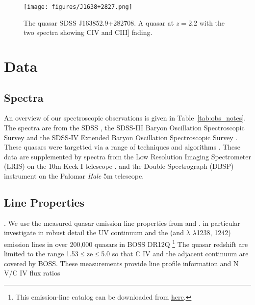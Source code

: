 \documentclass[a4paper,fleqn,usenatbib]{mnras}
\begin{document}
\begin{figure}
  \centering
  \texttt{[image: figures/J1638+2827.png]}
  \vspace{-12pt}
  \caption[]{The quasar SDSS J163852.9+282708. 
A quasar at $z = 2.2$ with the two spectra showing CIV and CIII] fading.}
  \label{fig:disk_suppression}
\end{figure}
\fi



\section{Data}
\subsection{Spectra}
An overview of our spectroscopic observations is given in Table~\ref{tab:obs_notes}. 
The spectra are from the SDSS \citep{Stoughton2002, DR7, Schneider2010},  
the SDSS-III Baryon Oscillation Spectroscopic Survey \citep[BOSS][]{Eisenstein2011, Dawson2013, Smee2013, Alam2015, Paris2017} 
and the SDSS-IV  Extended Baryon Oscillation Spectroscopic Survey \citep[eBOSS; ][]{Dawson2016, Abolfathi2018}. 
These quasars were targetted via a range of techniques and algorithms \citep[][]{Richards2002, Ross2012, 
Myers2015}.  
These data are supplemented by spectra from 
the Low Resolution Imaging Spectrometer (LRIS) on the 10m Keck {\sc I} telescope \citep{Oke1995}. 
and the Double Spectrograph (DBSP) instrument on the Palomar {\it Hale} 5m telescope. 


\subsection{Line Properties}. 
We use the measured quasar emission line properties from \citet{Shen2011} and \citet{Hamann2017}. 
\citet{Hamann2017} in particular investigate in robust detail the UV continuum and the \civ (and \nv $\lambda$ $\lambda$1238, 1242) emission lines in 
over 200,000 quasars in BOSS DR12Q \citep{Paris2017}\footnote{This emission-line catalog 
can be downloaded from \href{https://datadryad.org/stash/dataset/doi:10.6086/D1H59V}{here}.}
The quasar redshift are limited to the range 1.53 ≤ ze ≤ 5.0 so that C IV and the adjacent continuum are covered by BOSS. 
These measurements provide line profile information and N V/C IV flux ratios 
\end{document}
